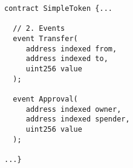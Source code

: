\begin{lstlisting}[language=Solidity]
contract SimpleToken {...

  // 2. Events
  event Transfer(
     address indexed from,
     address indexed to,
     uint256 value
  );

  event Approval(
     address indexed owner,
     address indexed spender,
     uint256 value
  );
    
...}
\end{lstlisting}